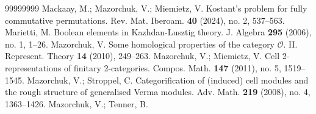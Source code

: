 \documentclass[a4paper]{amsart}
\begin{document}
\begin{thebibliography}{99999999}
Mackaay, M.; Mazorchuk, V.; Miemietz, V.
Kostant's problem for fully commutative permutations.
Rev. Mat. Iberoam. {\bf 40} (2024), no. 2, 537--563.
Marietti, M.
Boolean elements in Kazhdan-Lusztig theory.
J. Algebra {\bf 295} (2006), no. 1, 1--26.
 Mazorchuk, V. Some homological properties of the 
category $\mathcal{O}$. II. Represent. Theory {\bf 14} (2010), 249--263.
 Mazorchuk, V.; Miemietz, V. Cell 2-representations of 
finitary 2-categories. Compos. Math. {\bf 147} (2011), no. 5, 1519--1545.
 Mazorchuk, V.; Stroppel, C. Categorification of (induced) 
cell modules and the rough structure of generalised Verma modules. 
Adv. Math. {\bf 219} (2008), no. 4, 1363--1426.
Mazorchuk, V.; Tenner, B.

\end{thebibliography}
\end{document}
